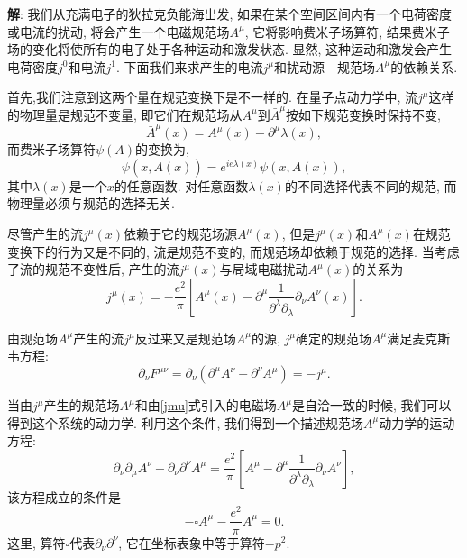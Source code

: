 \documentclass{ctexart}
\newenvironment{answer}{\textbf{解}:}{
\vspace{0.5cm}
}
\begin{document}
\begin{answer}
  我们从充满电子的狄拉克负能海出发, 如果在某个空间区间内有一个电荷密度或电流的扰动, 将会产生一个电磁规范场$A^\mu$, 它将影响费米子场算符, 结果费米子场的变化将使所有的电子处于各种运动和激发状态. 显然, 这种运动和激发会产生电荷密度$j^0$和电流$j^1$. 下面我们来求产生的电流$j^\mu$和扰动源---规范场$A^\mu$的依赖关系.

首先,我们注意到这两个量在规范变换下是不一样的. 在量子点动力学中, 流$j^\mu$这样的物理量是规范不变量, 即它们在规范场从$A^\mu$到$\bar{A}^\mu$按如下规范变换时保持不变,
\begin{equation}
  \bar{A}^\mu(x) = A^\mu (x) - \partial^\mu \lambda(x),
\end{equation}
而费米子场算符$\psi(A)$的变换为,
\begin{equation}
  \psi(x,\bar{A}(x)) = e^{ie\lambda(x)} \psi(x, A(x)),
\end{equation}
其中$\lambda(x)$是一个$x$的任意函数. 对任意函数$\lambda(x)$的不同选择代表不同的规范, 而物理量必须与规范的选择无关.

尽管产生的流$j^\mu(x)$依赖于它的规范场源$A^\mu(x)$, 但是$j^\mu(x)$和$A^\mu(x)$在规范变换下的行为又是不同的, 流是规范不变的, 而规范场却依赖于规范的选择. 当考虑了流的规范不变性后, 产生的流$j^\mu(x)$与局域电磁扰动$A^\mu(x)$的关系为
\begin{equation}\label{jmu}
  j^\mu(x) = - \frac{e^2}{\pi} [A^\mu(x) - \partial^\mu \frac{1}{\partial^\lambda\partial_\lambda} \partial_\nu A^\nu(x)].
\end{equation}

由规范场$A^\mu$产生的流$j^\mu$反过来又是规范场$A^\mu$的源, $j^\mu$确定的规范场$A^\mu$满足麦克斯韦方程:
\begin{equation}
  \partial_\nu F^{\mu\nu} = \partial_\nu (\partial^\mu A^\nu - \partial^\nu A^\mu) = -j^\mu.
\end{equation}

当由$j^\mu$产生的规范场$A^\mu$和由\eqref{jmu}式引入的电磁场$A^\mu$是自洽一致的时候, 我们可以得到这个系统的动力学. 利用这个条件, 我们得到一个描述规范场$A^\mu$动力学的运动方程:
\begin{equation}
  \partial_\nu \partial_\mu A^\nu - \partial_\nu \partial^\nu A^\mu = \frac{e^2}{\pi}[A^\mu - \partial^\mu \frac{1}{\partial^\lambda \partial_\lambda} \partial_\nu A^\nu],
\end{equation}
该方程成立的条件是
\begin{equation}
  -\square A^\mu - \frac{e^2}{\pi}A^\mu = 0.
\end{equation}
这里, 算符$\square$代表$\partial_\nu \partial^\nu$, 它在坐标表象中等于算符$-p^2$.


\end{answer}
\end{document}

